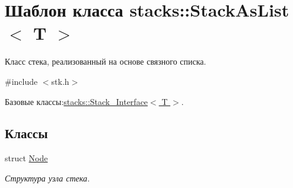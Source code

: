 \hypertarget{classstacks_1_1_stack_as_list}{}\section{Шаблон класса stacks\+:\+:Stack\+As\+List$<$ T $>$}
\label{classstacks_1_1_stack_as_list}


Класс стека, реализованный на основе связного списка.  




{\ttfamily \#include $<$stk.\+h$>$}



Базовые классы\+:\hyperlink{classstacks_1_1_stack___interface}{stacks\+::\+Stack\+\_\+\+Interface$<$ T $>$}.

\subsection*{Классы}
\begin{DoxyCompactItemize}
\item 
struct \hyperlink{structstacks_1_1_stack_as_list_1_1_node}{Node}
\begin{DoxyCompactList}\small\item\em Структура узла стека. \end{DoxyCompactList}\end{DoxyCompactItemize}
